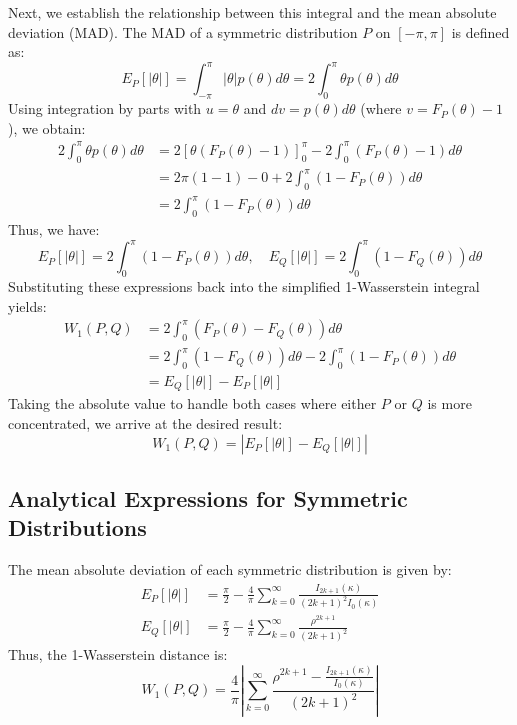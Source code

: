 \documentclass[11pt,a4paper]{article}
\begin{document}
Next, we establish the relationship between this integral and the mean absolute deviation (MAD). The MAD of a symmetric distribution $P$ on $[-\pi, \pi]$ is defined as:
\begin{equation}
E_P[|\theta|] = \int_{-\pi}^\pi |\theta| p(\theta) d\theta = 2 \int_0^\pi \theta p(\theta) d\theta
\end{equation}
Using integration by parts with $u = \theta$ and $dv = p(\theta)d\theta$ (where $v = F_P(\theta) - 1$), we obtain:
\begin{align}
2 \int_0^\pi \theta p(\theta) d\theta &= 2 \left[ \theta (F_P(\theta) - 1) \right]_0^\pi - 2 \int_0^\pi (F_P(\theta) - 1) d\theta \nonumber \\
&= 2 \pi (1 - 1) - 0 + 2 \int_0^\pi (1 - F_P(\theta)) d\theta \nonumber \\
&= 2 \int_0^\pi (1 - F_P(\theta)) d\theta
\end{align}
Thus, we have:
\begin{equation}
E_P[|\theta|] = 2 \int_0^\pi (1 - F_P(\theta)) d\theta, \quad E_Q[|\theta|] = 2 \int_0^\pi (1 - F_Q(\theta)) d\theta
\end{equation}
Substituting these expressions back into the simplified 1-Wasserstein integral yields:
\begin{align}
W_1(P, Q) &= 2 \int_0^\pi (F_P(\theta) - F_Q(\theta)) d\theta \nonumber \\
&= 2 \int_0^\pi (1 - F_Q(\theta)) d\theta - 2 \int_0^\pi (1 - F_P(\theta)) d\theta \nonumber \\
&= E_Q[|\theta|] - E_P[|\theta|]
\end{align}
Taking the absolute value to handle both cases where either $P$ or $Q$ is more concentrated, we arrive at the desired result:
\begin{equation}
W_1(P, Q) = | E_P[|\theta|] - E_Q[|\theta|] |
\end{equation}

\subsection{Analytical Expressions for Symmetric Distributions}
The mean absolute deviation of each symmetric distribution is given by:
\begin{align}
E_P[|\theta|] &= \frac{\pi}{2} - \frac{4}{\pi} \sum_{k=0}^\infty \frac{I_{2k+1}(\kappa)}{(2k+1)^2 I_0(\kappa)} \\
E_Q[|\theta|] &= \frac{\pi}{2} - \frac{4}{\pi} \sum_{k=0}^\infty \frac{\rho^{2k+1}}{(2k+1)^2}
\end{align}
Thus, the 1-Wasserstein distance is:
\begin{equation}
W_1(P, Q) = \frac{4}{\pi} \left| \sum_{k=0}^\infty \frac{\rho^{2k+1} - \frac{I_{2k+1}(\kappa)}{I_0(\kappa)}}{(2k+1)^2} \right|
\end{equation}
\end{document}
